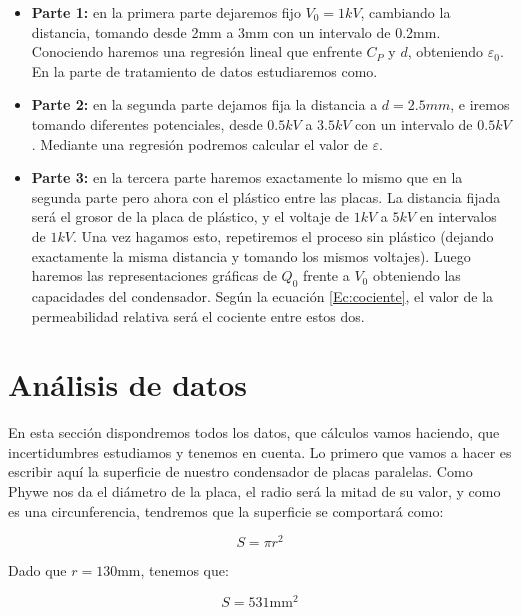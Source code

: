\documentclass[12pt,a4paper]{article}
\begin{document}
\begin{itemize}
\item \textbf{Parte 1:} en la primera parte dejaremos fijo $V_0=1kV$, cambiando la distancia, tomando desde 2mm a 3mm con un intervalo de 0.2mm. Conociendo haremos una regresión lineal que enfrente $C_P$ y $d$, obteniendo $\varepsilon_0$. En la parte de tratamiento de datos estudiaremos como.

\item \textbf{Parte 2:} en la segunda parte dejamos fija la distancia a $d=2.5mm$, e iremos tomando diferentes potenciales, desde $0.5kV$ a $3.5kV$ con un intervalo de $0.5kV$. Mediante una regresión podremos calcular el valor de $\varepsilon$.

\item \textbf{Parte 3:} en la tercera parte haremos exactamente lo mismo que en la segunda parte pero ahora con el plástico entre las placas. La distancia fijada será el grosor de la placa de plástico, y el voltaje de $1kV$ a $5kV$ en intervalos de $1kV$. Una vez hagamos esto, repetiremos el proceso sin plástico (dejando exactamente la misma distancia y tomando los mismos voltajes). Luego haremos las  representaciones gráficas de $Q_0$ frente a $V_0$ obteniendo las capacidades del condensador. Según la ecuación \ref{Ec:cociente}, el valor de la permeabilidad relativa será el cociente entre estos dos.

\end{itemize}


\section{Análisis de datos}

En esta sección dispondremos todos los datos, que cálculos vamos haciendo, que incertidumbres estudiamos y tenemos en cuenta. Lo primero que vamos a hacer es escribir aquí la superficie de nuestro condensador de placas paralelas. Como Phywe nos da el diámetro de la placa, el radio será la mitad de su valor, y como es una circunferencia, tendremos que la superficie se comportará como:

\begin{equation}
S = \pi r^2
\end{equation}

Dado que $r=130$mm, tenemos que:

\begin{equation}
S = 531 \mathrm{mm}^2
\end{equation}
\end{document}

